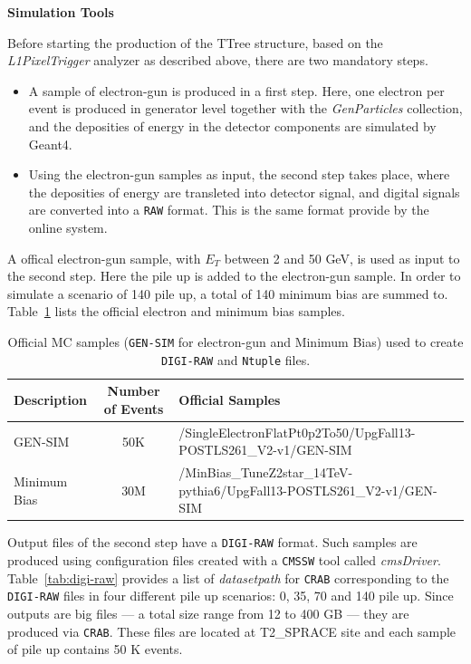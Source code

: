 \textbf{Simulation Tools}

Before starting the production of the TTree structure, based on the \textit{L1PixelTrigger} analyzer as described
above, there are two mandatory steps.
\begin{itemize}
\item A sample of electron-gun is produced in a first step. Here, one electron per event is produced in generator
  level together with the {\it GenParticles} collection, and the deposities of energy in the detector components
  are simulated by Geant4.
\item Using the electron-gun samples as input, the second step takes place, where the deposities of energy are
  transleted into detector signal, and digital signals are converted into a {\texttt{RAW}} format. This is the
  same format provide by the online system.
\end{itemize}

A offical electron-gun sample, with $E_{T}$ between 2 and 50 GeV, is used as input to the second step. Here the
pile up is added to the electron-gun sample. In order to simulate a scenario of 140 pile up, a total of 140
minimum bias are summed to. Table~\ref{tab:gen-sim-minbias} lists the official electron and minimum bias samples.

\begin{table}[!htb]
  \centering
  \scriptsize
  \caption{Official MC samples (\texttt{GEN-SIM} for electron-gun and Minimum Bias) used to create
    \texttt{DIGI-RAW} and \texttt{Ntuple} files.}
  \label{tab:gen-sim-minbias}
  \begin{tabular}{lcl}
    \hline
        {\bf Description} & {\bf Number of Events} & {\bf Official Samples} \\ \hline \hline
        GEN-SIM           & 50K                    & /SingleElectronFlatPt0p2To50/UpgFall13-POSTLS261\_V2-v1/GEN-SIM \\ \hline
        Minimum Bias      & 30M                    & /MinBias\_TuneZ2star\_14TeV-pythia6/UpgFall13-POSTLS261\_V2-v1/GEN-SIM \\ \hline
  \end{tabular}
\end{table}

Output files of the second step have a \texttt{DIGI-RAW} format. Such samples are produced using configuration
files created with a \texttt{CMSSW} tool called {\it cmsDriver}. Table~\ref{tab:digi-raw} provides a list of
{\it datasetpath} for \texttt{CRAB} corresponding to the \texttt{DIGI-RAW} files in four different pile up
scenarios: 0, 35, 70 and 140 pile up. Since outputs are big files --- a total size range from 12 to 400 GB ---
they are produced via \texttt{CRAB}. These files are located at T2\_SPRACE site and each sample of pile up
contains 50 K events.

